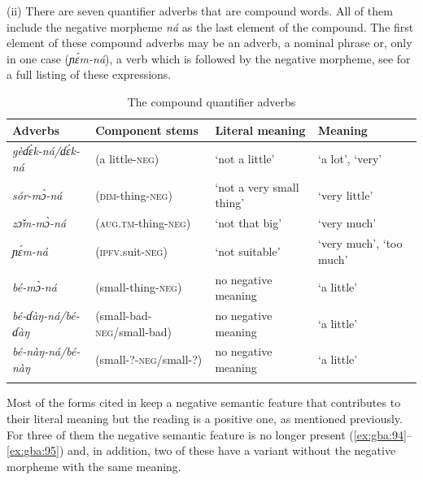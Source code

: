 \documentclass[output=paper,colorlinks=true, citecolor=brown]{langscibook}
\begin{document}
{(ii)} There are seven quantifier adverbs that are compound words. All of them include the negative morpheme \textit{ná} as the last element of the compound. The first element of these compound adverbs may be an adverb, a nominal phrase or, only in one case (\textit{ɲɛ́m-ná}), a verb which is followed by the negative morpheme, see  for a full listing of these expressions.
\begin{table}
\begin{tabularx}{\textwidth}{llQQ}
\lsptoprule
{Adverbs} & {Component stems} & {Literal meaning} & {Meaning}\\
\midrule 
\textit{gèɗɛ̀k-ná\slash ɗɛ́k-ná} & {(a little-\textsc{neg)}} & {‘not a little}’ & {‘a lot’, ‘very’}\\
\textit{sór-mɔ̀-ná} & {(\textsc{dim}-thing-\textsc{neg})} & {‘not a very small thing}’ & {‘very little’}\\
\textit{zɔ̌m-mɔ̀-ná} & {(\textsc{aug.tm}-thing-\textsc{neg})} & {‘not that big}’ & {‘very much’}\\
\textit{ɲɛ́m-ná} & {(\textsc{ipfv.}suit-\textsc{neg})} & {‘not suitable}’ & {‘very much’, ‘too much’}\\
\textit{bé-mɔ̀-ná} & {(small-thing-\textsc{neg})} & {no negative meaning} & {‘a little’}\\
\textit{bé-ɗàŋ-ná\slash bé-ɗàŋ} & {(small-bad-\textsc{neg}\slash small-bad)} & {no negative meaning} & {‘a little’} \\
\textit{bé-nàŋ-ná\slash bé-nàŋ} & {(small-?-\textsc{neg}\slash small-?)} & {no negative meaning} & {‘a little’} \\
\lspbottomrule
\end{tabularx}
\caption{The compound quantifier adverbs}
\label{tab:gba:6}
\end{table}

Most of the forms cited in  keep a negative semantic feature that contributes to their literal meaning but the reading is a positive one, as mentioned previously. For three of them the negative semantic feature is no longer present (\ref{ex:gba:94}--\ref{ex:gba:95}) and, in addition, two of these have a variant without the negative morpheme with the same meaning.
\end{document}
